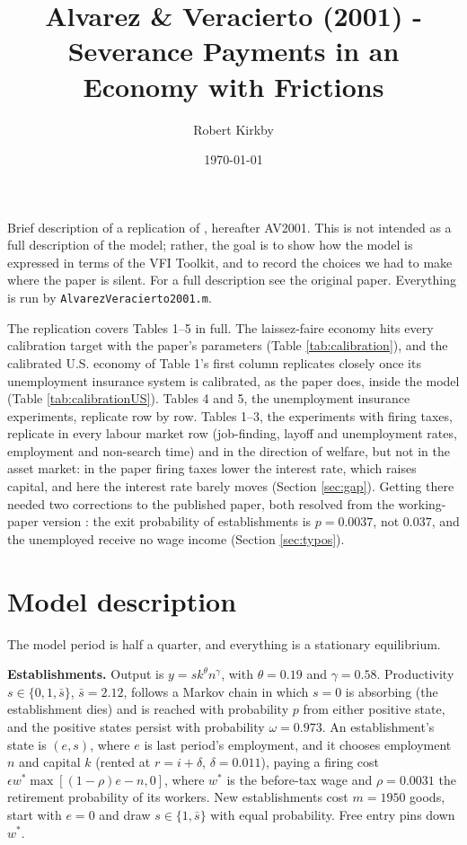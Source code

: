\documentclass[11pt,fleqn]{article}
\begin{document}
\sloppy

\title{Alvarez \& Veracierto (2001) - Severance Payments in an Economy with Frictions}
\author{Robert Kirkby}
\date{\today}
\maketitle

Brief description of a replication of \cite*{AlvarezVeracierto2001}, hereafter AV2001. This is not intended as a full description of the model; rather, the goal is to show how the model is expressed in terms of the VFI Toolkit, and to record the choices we had to make where the paper is silent. For a full description see the original paper. Everything is run by \verb|AlvarezVeracierto2001.m|.

The replication covers Tables 1--5 in full. The laissez-faire economy hits every calibration target with the paper's parameters (Table \ref{tab:calibration}), and the calibrated U.S. economy of Table 1's first column replicates closely once its unemployment insurance system is calibrated, as the paper does, inside the model (Table \ref{tab:calibrationUS}). Tables 4 and 5, the unemployment insurance experiments, replicate row by row. Tables 1--3, the experiments with firing taxes, replicate in every labour market row (job-finding, layoff and unemployment rates, employment and non-search time) and in the direction of welfare, but not in the asset market: in the paper firing taxes lower the interest rate, which raises capital, and here the interest rate barely moves (Section \ref{sec:gap}). Getting there needed two corrections to the published paper, both resolved from the working-paper version \citep{AlvarezVeracierto1998}: the exit probability of establishments is $p=0.0037$, not $0.037$, and the unemployed receive no wage income (Section \ref{sec:typos}).


\section{Model description}

The model period is half a quarter, and everything is a stationary equilibrium.

\textbf{Establishments.} Output is $y=sk^\theta n^\gamma$, with $\theta=0.19$ and $\gamma=0.58$. Productivity $s\in\{0,1,\bar{s}\}$, $\bar{s}=2.12$, follows a Markov chain in which $s=0$ is absorbing (the establishment dies) and is reached with probability $p$ from either positive state, and the positive states persist with probability $\omega=0.973$. An establishment's state is $(e,s)$, where $e$ is last period's employment, and it chooses employment $n$ and capital $k$ (rented at $r=i+\delta$, $\delta=0.011$), paying a firing cost $\epsilon w^*\max[(1-\rho)e-n,0]$, where $w^*$ is the before-tax wage and $\rho=0.0031$ the retirement probability of its workers. New establishments cost $m=1950$ goods, start with $e=0$ and draw $s\in\{1,\bar{s}\}$ with equal probability. Free entry pins down $w^*$.
\end{document}
